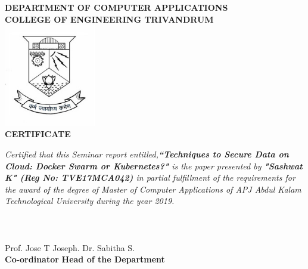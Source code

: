 
\begin{titlepage}
\begin{center}
\textbf{DEPARTMENT OF COMPUTER APPLICATIONS}\\[0.5cm]
\textbf{ COLLEGE OF ENGINEERING TRIVANDRUM}\\
[0.5cm]
\vspace{1.2cm}
\includegraphics[width=0.30\textwidth]{1-title/images/cet.jpg}\\
\vspace{0.8cm}
\textbf{CERTIFICATE}\\
\end{center}
\emph{Certified that this Seminar report entitled,\textbf{``Techniques to Secure Data on Cloud: Docker Swarm or Kubernetes?"} is the paper presented by \textbf{"Sashwat K" (Reg No: TVE17MCA042)} in partial fulfillment of the requirements for the award of the degree of Master of Computer Applications of APJ Abdul Kalam Technological University during the year 2019.}\\\\\\\\
\vspace{0.9cm}
Prof. Jose T Joseph.
\hspace{9.3cm}
Dr. Sabitha S.\\ 
\hspace{5cm}
 \textbf{Co-ordinator}
\hspace{9cm}
\textbf{Head of the Department}

\end{titlepage}
